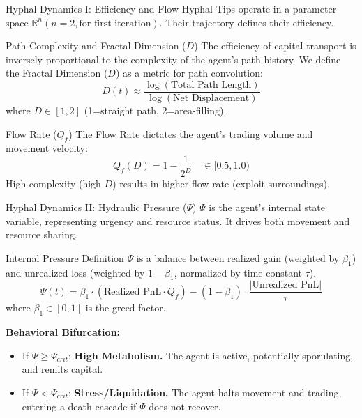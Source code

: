 \documentclass[aspectratio=169, 10pt]{beamer}
\newcommand{\Pressure}{\Psi}
\newcommand{\FlowRate}{Q_f}
\newcommand{\Dimen}{D}
\begin{document}
	\begin{frame}{Hyphal Dynamics I: Efficiency and Flow}
		Hyphal Tips operate in a parameter space $\mathbb{R}^n (n = 2, \text{for first iteration})$. Their trajectory defines their efficiency.
		
		\begin{block}{Path Complexity and Fractal Dimension ($\Dimen$)}
			The efficiency of capital transport is inversely proportional to the complexity of the agent's path history. We define the Fractal Dimension ($\Dimen$) as a metric for path convolution:
			\begin{equation*}
				\Dimen(t) \approx \frac{\log(\text{Total Path Length})}{\log(\text{Net Displacement})}
			\end{equation*}
			where $\Dimen \in [1, 2]$ (1=straight path, 2=area-filling).
		\end{block}
		
		\begin{block}{Flow Rate ($\FlowRate$)}
			The Flow Rate dictates the agent's trading volume and movement velocity:
			\begin{equation*}
				\FlowRate(\Dimen) = 1 - \frac{1}{2^{\Dimen}} \quad \in [0.5, 1.0)
			\end{equation*}
			High complexity (high $\Dimen$) results in higher flow rate (exploit surroundings).
		\end{block}
	\end{frame}
	
	\begin{frame}{Hyphal Dynamics II: Hydraulic Pressure ($\Pressure$)}
		$\Pressure$ is the agent's internal state variable, representing urgency and resource status. It drives both movement and resource sharing.
		
		\begin{block}{Internal Pressure Definition}
			$\Pressure$ is a balance between realized gain (weighted by $\beta_1$) and unrealized loss (weighted by $1-\beta_1$, normalized by time constant $\tau$).
			\begin{equation*}
				\Pressure(t) = \beta_{1} \cdot (\text{Realized PnL} \cdot \FlowRate) - (1-\beta_{1}) \cdot \frac{|\text{Unrealized PnL}|}{\tau}
			\end{equation*}
			where $\beta_1 \in [0, 1]$ is the greed factor.
		\end{block}
		
		\vspace{0.3cm}
		\textbf{Behavioral Bifurcation:}
		\begin{itemize}
			\item If $\Pressure \ge \Pressure_{crit}$: \textbf{High Metabolism.} The agent is active, potentially sporulating, and remits capital.
			\item If $\Pressure < \Pressure_{crit}$: \textbf{Stress/Liquidation.} The agent halts movement and trading, entering a death cascade if $\Pressure$ does not recover.
		\end{itemize}
	\end{frame}
	
\end{document}
